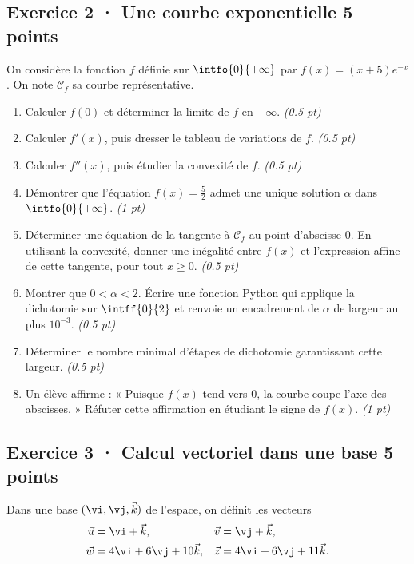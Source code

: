 \subsection*{Exercice 2 · Une courbe exponentielle \hfill 5 points}On considère la fonction $f$ définie sur $\intfo{0}{+\infty}$ par $f(x)=(x+5)e^{-x}$. On note $\mathcal C_f$ sa courbe représentative.

\begin{enumerate}

\item Calculer $f(0)$ et déterminer la limite de $f$ en $+\infty$. \hfill\textit{(\num{0,5} pt)}

\item Calculer $f' (x)$, puis dresser le tableau de variations de $f$. \hfill\textit{(\num{0,5} pt)}

\item Calculer $f'' (x)$, puis étudier la convexité de $f$. \hfill\textit{(\num{0,5} pt)}

\item Démontrer que l'équation $f(x)=\frac{5}{2}$ admet une unique solution $\alpha$ dans $\intfo{0}{+\infty}$. \hfill\textit{(1 pt)}

\item Déterminer une équation de la tangente à $\mathcal C_f$ au point d'abscisse $0$. En utilisant la convexité, donner une inégalité entre $f(x)$ et l'expression affine de cette tangente, pour tout $x\ge0$. \hfill\textit{(\num{0,5} pt)}

\item Montrer que $0<\alpha<2$. Écrire une fonction Python qui applique la dichotomie sur $\intff{0}{2}$ et renvoie un encadrement de $\alpha$ de largeur au plus $10^{-3}$. \hfill\textit{(\num{0,5} pt)}

\item Déterminer le nombre minimal d'étapes de dichotomie garantissant cette largeur. \hfill\textit{(\num{0,5} pt)}

\item Un élève affirme : « Puisque $f(x)$ tend vers $0$, la courbe coupe l'axe des abscisses. » Réfuter cette affirmation en étudiant le signe de $f(x)$. \hfill\textit{(1 pt)}

\end{enumerate}

\mxnewpage{}

\subsection*{Exercice 3 · Calcul vectoriel dans une base \hfill 5 points}Dans une base $(\vi,\vj,\vec k)$ de l'espace, on définit les vecteurs
\[\begin{aligned}\vec u&=\vi+\vec k,&\vec v&=\vj+\vec k,\\
\vec w&=4\vi+6\vj+10\vec k,&\vec z&=4\vi+6\vj+11\vec k.\end{aligned}\]

